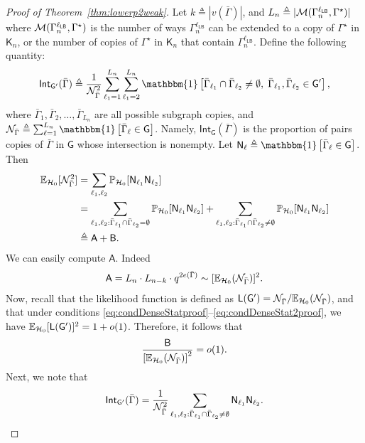 \documentclass[12pt]{article}
\newcommand{\bE}{\mathbb{E}}
\newcommand{\Ind}{\mathbbm{1}}
\newcommand {\pr} {\mathbb{P}}
\newcommand{\calH}{{\cal H}}
\newcommand{\calM}{{\cal M}}
\newcommand{\calN}{{\cal N}}
\newcommand{\pp}[1]{\left[#1\right]}
\newcommand{\s}[1]{\mathsf{#1}}
\begin{document}
\begin{proof}[Proof of Theorem~\ref{thm:lowerp2weak}]
Let $k\triangleq|v(\bar\Gamma)|$, and $L_n\triangleq|\calM(\Gamma_n^{\ell_{\s{LB}}},\Gamma^\star)|$ where $\calM(\Gamma_n^{\ell_{\s{LB}}},\Gamma^\star)$ is the number of ways $\Gamma_n^{\ell_{\s{LB}}}$ can be extended to a copy of $\Gamma^\star$ in $\s{K}_n$, or the number of copies of $\Gamma^\star$ in $\s{K}_n$ that contain $\Gamma_n^{\ell_{\s{LB}}}$. Define the following quantity:
\begin{align}
\s{Int}_{\s{G}'}(\bar\Gamma)\triangleq \frac{1}{\calN^2_{\bar\Gamma}}\sum_{\ell_1=1}^{L_n}\sum_{\ell_1=2}^{L_n}\Ind\pp{\bar{\Gamma}_{\ell_1}\cap\bar{\Gamma}_{\ell_2}\neq\emptyset,\;\bar{\Gamma}_{\ell_1},\bar{\Gamma}_{\ell_2}\in\s{G}'},
\end{align}
where $\bar{\Gamma}_1,\bar{\Gamma}_2,\ldots,\bar{\Gamma}_{L_n}$ are all possible subgraph copies, and $\calN_{\bar\Gamma}\triangleq \sum_{\ell=1}^{L_n}\Ind\pp{\bar{\Gamma}_\ell\in\s{G}}$. Namely, $\s{Int}_{\s{G}}(\bar\Gamma)$ is the proportion of pairs copies of $\bar\Gamma$ in $\s{G}$ whose intersection is nonempty. Let $\s{N}_\ell\triangleq\Ind\pp{\bar{\Gamma}_\ell\in\s{G}}$. Then
\begin{align}
\bE_{\calH_0}[\calN^2_{\bar\Gamma}] &= \sum_{\ell_1,\ell_2}\pr_{\calH_0}[\s{N}_{\ell_1}\s{N}_{\ell_2}] \\
&= \sum_{\ell_1,\ell_2:\bar{\Gamma}_{\ell_1}\cap\bar{\Gamma}_{\ell_2}=\emptyset}\pr_{\calH_0}[\s{N}_{\ell_1}\s{N}_{\ell_2}]+\sum_{\ell_1,\ell_2:\bar{\Gamma}_{\ell_1}\cap\bar{\Gamma}_{\ell_2}\neq\emptyset}\pr_{\calH_0}[\s{N}_{\ell_1}\s{N}_{\ell_2}]\\
& \triangleq \s{A}+\s{B}.
\end{align}
We can easily compute $\s{A}$. Indeed
\begin{align}
\s{A} = L_n\cdot L_{n-k}\cdot q^{2e(\bar\Gamma)}\sim [\bE_{\calH_0}(\calN_{\bar\Gamma})]^2.
\end{align}
Now, recall that the likelihood function is defined as $\s{L}(\s{G}') = \calN_{\bar\Gamma}/\bE_{\calH_0}(\calN_{\bar\Gamma})$, and that under conditions \eqref{eq:condDenseStatproof}--\eqref{eq:condDenseStat2proof}, we have $\bE_{\calH_0}[\s{L}(\s{G}')]^2=1+o(1)$. Therefore, it follows that
\begin{align}
\frac{\s{B}}{\pp{\bE_{\calH_0}(\calN_{\bar\Gamma})}^2}=o(1).\label{eqn:Basymp}
\end{align}
Next, we note that
\begin{align}
\s{Int}_{\s{G}'}(\bar\Gamma)= \frac{1}{\calN^2_{\bar\Gamma}}\sum_{\ell_1,\ell_2:\bar{\Gamma}_{\ell_1}\cap\bar{\Gamma}_{\ell_2}\neq\emptyset}\s{N}_{\ell_1}\s{N}_{\ell_2}.

\end{align}
\end{proof}
\end{document}
